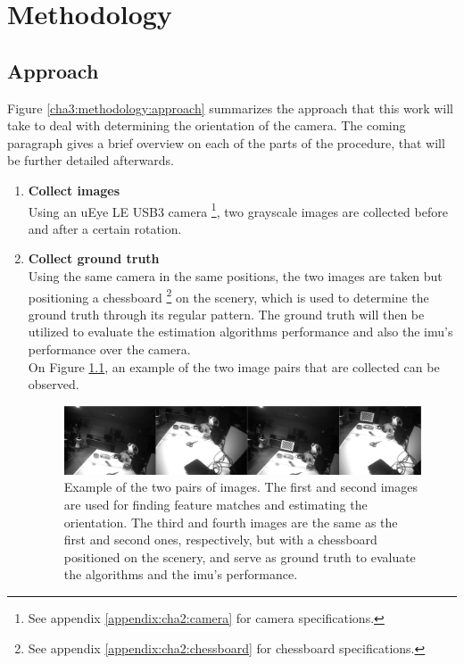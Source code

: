
\chapter{Methodology}
\label{methodology}

\section{Approach}

Figure \ref{cha3:methodology:approach} summarizes the approach that this work will take to deal with determining the orientation of the camera. The coming paragraph gives a brief overview on each of the parts of the procedure, that will be further detailed afterwards.

\begin{enumerate}
	\item \textbf{Collect images}\\
	 Using an uEye LE USB3 camera \footnote{See appendix \ref{appendix:cha2:camera} for camera specifications.}, two grayscale images are collected before and after a certain rotation.
	 
	 \item \textbf{Collect ground truth}\\
	 Using the same camera in the same positions, the two images are taken but positioning a chessboard \footnote{See appendix \ref{appendix:cha2:chessboard} for chessboard specifications.} on the scenery, which is used to determine the ground truth through its regular pattern. The ground truth will then be utilized to evaluate the estimation algorithms performance and also the \acrshort{imu}'s performance over the camera.\\
	 
	 On Figure \ref{cha3:methodology:imagesex}, an example of the two image pairs that are collected can be observed.
	 
\begin{figure}[ht]
	 \centering
	 \includegraphics[width=\textwidth]{images/imagesex.png}
	 \caption[Example of the two pairs of images]{Example of the two pairs of images. The first and second images are used for finding feature matches and estimating the orientation. The third and fourth images are the same as the first and second ones, respectively, but with a chessboard positioned on the scenery, and serve as ground truth to evaluate the algorithms and the \acrshort{imu}'s performance.}
	 \label{cha3:methodology:imagesex}
 \end{figure}
	 

\end{enumerate}

